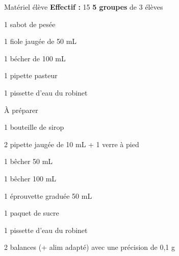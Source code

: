 
\begin{boiteMateriel}{Matériel élève}
  \textbf{Effectif :} 15
  \qq{}\qq{}
  \flecheLongue \textbf{5 groupes} de 3 élèves

  \begin{multicols}{2}
    \begin{protocole}
      \item 1 sabot de pesée
      \item 1 fiole jaugée de 50 mL
      \item 1 bécher de 100 mL
      \item 1 pipette pasteur
      \item 1 pissette d’eau du robinet
    \end{protocole}
  \end{multicols}
\end{boiteMateriel}


\begin{boiteMateriel}{À préparer}
  \begin{protocole}
    \item 1 bouteille de sirop
    \item 2 pipette jaugée de 10 mL + 1 verre à pied
    \item 1 bêcher 50 mL
    \item 1 bêcher 100 mL
    \item 1 éprouvette graduée 50 mL
    \item 1 paquet de sucre
    \item 1 pissette d’eau du robinet
    \item 2 balances (+ alim adapté) avec une précision de 0,1 g
  \end{protocole}
\end{boiteMateriel}